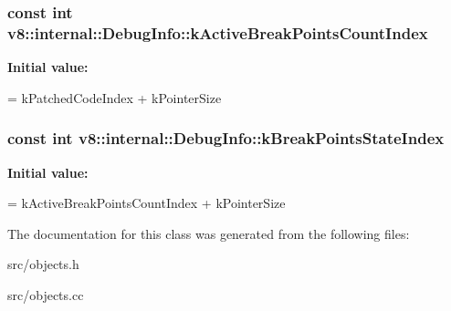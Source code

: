 \subsubsection[{k\+Active\+Break\+Points\+Count\+Index}]{\setlength{\rightskip}{0pt plus 5cm}const int v8\+::internal\+::\+Debug\+Info\+::k\+Active\+Break\+Points\+Count\+Index\hspace{0.3cm}{\ttfamily [static]}}\label{classv8_1_1internal_1_1_debug_info_a8485069bf33e7b36f9979f6e16bb9758}
{\bfseries Initial value\+:}
\begin{DoxyCode}
=
      kPatchedCodeIndex + kPointerSize
\end{DoxyCode}
\hypertarget{classv8_1_1internal_1_1_debug_info_a52dd29dcab3707ffd1fbbbc979d76cd3}{}
\subsubsection[{k\+Break\+Points\+State\+Index}]{\setlength{\rightskip}{0pt plus 5cm}const int v8\+::internal\+::\+Debug\+Info\+::k\+Break\+Points\+State\+Index\hspace{0.3cm}{\ttfamily [static]}}\label{classv8_1_1internal_1_1_debug_info_a52dd29dcab3707ffd1fbbbc979d76cd3}
{\bfseries Initial value\+:}
\begin{DoxyCode}
=
      kActiveBreakPointsCountIndex + kPointerSize
\end{DoxyCode}


The documentation for this class was generated from the following files\+:\begin{DoxyCompactItemize}
\item 
src/objects.\+h\item 
src/objects.\+cc\end{DoxyCompactItemize}
